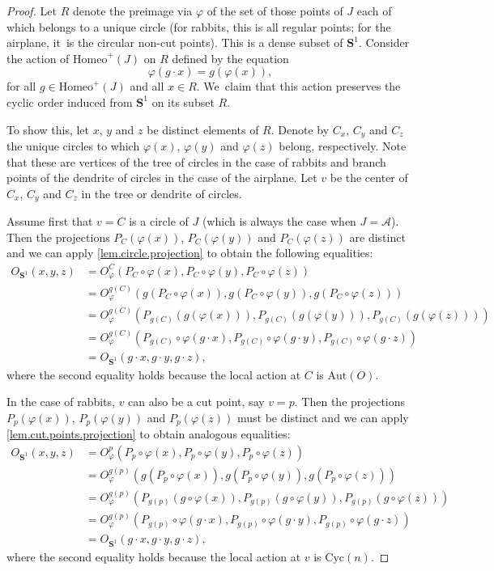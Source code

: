 \documentclass[JEP,XML,SOM,Unicode,NoFloatCountersInSection,published]{cedram}
\theoremstyle{plain}
\theoremstyle{definition}
\theoremstyle{remark}
\newcommand{\Aut}{\mathrm{Aut}}
\newcommand{\Cyc}{\mathrm{Cyc}}
\newcommand{\Homeo}{\mathrm{Homeo}}
\newcommand{\A}{\mathcal{A}}
\begin{document}
\begin{proof}
Let $R$ denote the preimage via $\varphi$ of the set of those points of $J$ each of which belongs to a unique circle (for rabbits, this is all regular points; for the airplane, it~is the circular non-cut points).
This is a dense subset of $\mathbf{S}^1$.
Consider the action of $\Homeo^+(J)$ on $R$ defined by the equation
\[
 \varphi(g \cdot x) = g(\varphi(x)), 
\]
for all $g \in \Homeo^+(J)$ and all $x \in R$. We~claim that this action preserves the cyclic order induced from $\mathbf{S}^1$ on its subset $R$.

To show this, let $x$, $y$ and $z$ be distinct elements of $R$.
Denote by $C_x$, $C_y$ and $C_z$ the unique circles to which $\varphi(x)$, $\varphi(y)$ and $\varphi(z)$ belong, respectively.
Note that these are vertices of the tree of circles in the case of rabbits and branch points of the dendrite of circles in the case of the airplane.
Let $v$ be the center of $C_x$, $C_y$ and $C_z$ in the tree or dendrite of circles.

Assume first that $v=C$ is a circle of $J$ (which is always the case when $J=\A$).
Then the projections $P_C(\varphi(x))$, $P_C(\varphi(y))$ and $P_C(\varphi(z))$ are distinct and we can apply \cref{lem.circle.projection} to obtain the following equalities:
\begin{align*}
O_{\mathbf{S}^1}(x,y,z) &=
O_\varphi^C(P_C\circ\varphi(x),P_C\circ\varphi(y),P_C\circ\varphi(z)) \\
&=O_\varphi^{g(C)}(g(P_C\circ\varphi(x)),g(P_C\circ\varphi(y)),g(P_C\circ\varphi(z))) \\
&=O_\varphi^{g(C)}(P_{g(C)}(g(\varphi(x))), P_{g(C)}(g(\varphi(y))), P_{g(C)}(g(\varphi(z)))) \\
&=O_\varphi^{g(C)}(P_{g(C)}\circ \varphi(g\cdot x), P_{g(C)}\circ \varphi(g\cdot y), P_{g(C)}\circ \varphi(g\cdot z)) \\
&=O_{\mathbf{S}^1}(g\cdot x, g\cdot y, g\cdot z),
\end{align*}
where the second equality holds because the local action at $C$ is $\Aut(O)$.

In the case of rabbits, $v$ can also be a cut point, say $v=p$.
Then the projections $P_p(\varphi(x))$, $P_p(\varphi(y))$ and $P_p(\varphi(z))$ must be distinct and we can apply \cref{lem.cut.points.projection} to obtain analogous equalities:
\begin{align*}
O_{\mathbf{S}^1}(x,y,z) &=
O_\varphi^p(P_p\circ\varphi(x),P_p\circ\varphi(y),P_p\circ\varphi(z)) \\
&=O_\varphi^{g(p)}(g(P_p\circ\varphi(x)), g(P_p\circ\varphi(y)), g(P_p\circ\varphi(z))) \\
&=O_\varphi^{g(p)}(P_{g(p)}(g\circ\varphi(x)), P_{g(p)}(g\circ\varphi(y)), P_{g(p)}(g\circ\varphi(z))) \\
&=O_\varphi^{g(p)}(P_{g(p)}\circ \varphi(g\cdot x), P_{g(p)}\circ \varphi(g\cdot y), P_{g(p)}\circ \varphi(g\cdot z)) \\
&=O_{\mathbf{S}^1}(g\cdot x, g\cdot y, g\cdot z),
\end{align*}
where the second equality holds because the local action at $v$ is $\Cyc(n)$.


\end{proof}
\end{document}
